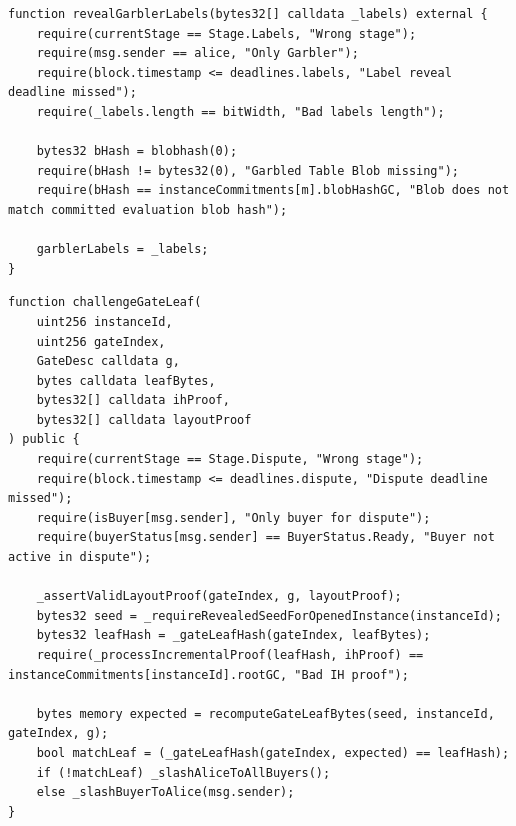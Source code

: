 \documentclass[final,twoside]{vutinfth}
\begin{document}
\begin{lstlisting}[style=soliditysnippet,caption={Blob-hash commitment check before label reveal for instance $m$.},label={lst:blob-binding}]
function revealGarblerLabels(bytes32[] calldata _labels) external {
    require(currentStage == Stage.Labels, "Wrong stage");
    require(msg.sender == alice, "Only Garbler");
    require(block.timestamp <= deadlines.labels, "Label reveal deadline missed");
    require(_labels.length == bitWidth, "Bad labels length");

    bytes32 bHash = blobhash(0);
    require(bHash != bytes32(0), "Garbled Table Blob missing");
    require(bHash == instanceCommitments[m].blobHashGC, "Blob does not match committed evaluation blob hash");

    garblerLabels = _labels;
}
\end{lstlisting}

\begin{lstlisting}[style=soliditysnippet,caption={Bounded GC-leaf dispute check with slashing outcome.},label={lst:gc-dispute}]
function challengeGateLeaf(
    uint256 instanceId,
    uint256 gateIndex,
    GateDesc calldata g,
    bytes calldata leafBytes,
    bytes32[] calldata ihProof,
    bytes32[] calldata layoutProof
) public {
    require(currentStage == Stage.Dispute, "Wrong stage");
    require(block.timestamp <= deadlines.dispute, "Dispute deadline missed");
    require(isBuyer[msg.sender], "Only buyer for dispute");
    require(buyerStatus[msg.sender] == BuyerStatus.Ready, "Buyer not active in dispute");

    _assertValidLayoutProof(gateIndex, g, layoutProof);
    bytes32 seed = _requireRevealedSeedForOpenedInstance(instanceId);
    bytes32 leafHash = _gateLeafHash(gateIndex, leafBytes);
    require(_processIncrementalProof(leafHash, ihProof) == instanceCommitments[instanceId].rootGC, "Bad IH proof");

    bytes memory expected = recomputeGateLeafBytes(seed, instanceId, gateIndex, g);
    bool matchLeaf = (_gateLeafHash(gateIndex, expected) == leafHash);
    if (!matchLeaf) _slashAliceToAllBuyers();
    else _slashBuyerToAlice(msg.sender);
}
\end{lstlisting}
\end{document}
